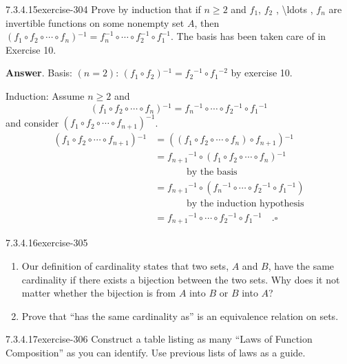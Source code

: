 \documentclass[twoside,10pt,]{book}
\numberwithin{equation}{section}
\begin{document}
\begin{divisionsolution}{7.3.4.15}{}{exercise-304}%
\hypertarget{p-2515}{}%
Prove by induction that if \(n\geq  2\) and \(f_1\), \(f_2\) , \textbackslash{}ldots  , \(f_n\) are invertible functions on some nonempty set \(A\), then \textbraceleft{} \textbraceright{}\(\left( f_1\circ  f_2\circ  \cdots  \circ  f_n \right){}^{-1}= f_n^{-1}\circ \cdots \circ f_2^{-1}\circ f_1^{-1}\). The basis has been taken care of in Exercise 10.%
\par\smallskip%
\noindent\textbf{Answer}.\quad%
\hypertarget{p-2516}{}%
Basis: \((n=2)\): \(\left(f_1\circ f_2\right){}^{-1}=f_2{}^{-1}\circ f_1{}^{-2}\) by exercise 10.%
\par
\hypertarget{p-2517}{}%
Induction: Assume \(n\geq 2\) and%
\begin{equation*}
\left(f_1\circ f_2\circ \cdots \circ f_n\right){}^{-1}= f_n{}^{-1}\circ \cdots \circ f_2{}^{-1}\circ f_1{}^{-1}
\end{equation*}
and consider \(\left(f_1\circ f_2\circ \cdots \circ f_{n+1}\right)^{-1}\).%
\begin{equation*}
\begin{split}
\left(f_1\circ f_2\circ \cdots \circ f_{n+1}\right){}^{-1} &=\left(\left(f_1\circ f_2\circ \cdots \circ f_n\right)\circ f_{n+1}\right){}^{-1}\\
& =f_{n+1}{}^{-1}\circ \left(f_1\circ f_2\circ \cdots \circ f_n\right){}^{-1}\\
& \quad \quad \quad \textrm{ by the basis}\\
&=f_{n+1}{}^{-1}\circ \left(f_n{}^{-1}\circ \cdots \circ f_2{}^{-1}\circ f_1{}^{-1}\right)\\
& \quad \quad \quad \textrm{ by the induction hypothesis}\\
&=f_{n+1}{}^{-1}\circ \cdots \circ f_2{}^{-1}\circ f_1{}^{-1} \quad. \square
\end{split}
\end{equation*}
%
\end{divisionsolution}%
\begin{divisionsolution}{7.3.4.16}{}{exercise-305}%
\hypertarget{p-2518}{}%
\leavevmode%
\begin{enumerate}[label=(\alph*)]
\item\hypertarget{li-1273}{}Our definition of cardinality states that two sets, \(A\) and \(B\), have the same cardinality if there exists a bijection between the two sets. Why does it not matter whether the bijection is from \(A\) into \(B\) or \(B\) into \(A\)?%
\item\hypertarget{li-1274}{}\hypertarget{p-2519}{}%
Prove that ``has the same cardinality as'' is an equivalence relation on sets.%
\end{enumerate}
%
\end{divisionsolution}%
\begin{divisionsolution}{7.3.4.17}{}{exercise-306}%
\hypertarget{p-2520}{}%
Construct a table listing as many ``Laws of Function Composition'' as you can identify. Use previous lists of laws as a guide.%
\end{divisionsolution}%
\end{document}
